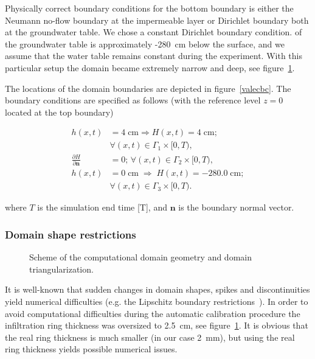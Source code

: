 \documentclass[review,times,3p,10pt]{elsarticle}
\newenvironment{lineq}
    {\begin{linenomath*}
    \begin{equation}
    }
    { 
    \end{equation} 
    \end{linenomath*}
    }
\renewcommand{\vec}{\mathbf}
\newcommand{\mich}[1]{{\color{magenta}{#1}}}
\begin{document}
Physically correct boundary conditions for the bottom boundary is either the Neumann no-flow boundary at the impermeable layer or Dirichlet boundary both at the groundwater table. We chose a constant Dirichlet boundary condition. \mich{The minimal depth} of the groundwater table is approximately -280~cm below the surface, and  we assume that the water table remains constant during the experiment. With this particular setup the domain became extremely narrow and deep, see figure~\ref{valec}.





The locations of the domain boundaries are depicted in figure~\ref{valecbc}. The boundary conditions are specified as follows (with the reference level $z=0$ located at the top boundary)
\begin{lineq} 
\label{bccond}
\begin{split}
h(x,t) &= 4 \; \mbox{cm} \Rightarrow H(x,t) = 4 \; \mbox{cm}; \\ &\forall (x,t) \in \Gamma_1 \times [0,T), \\
\frac{\partial H}{\partial \vec{n}} &= 0; \, \forall (x,t) \in \Gamma_2 \times [0,T), \\
h(x,t) &= 0  \; \mbox{cm}  \; \Rightarrow \; H(x,t) = -280.0  \; \mbox{cm}; \\ &\forall (x,t) \in \Gamma_3 \times [0,T).
\end{split}
\end{lineq}
where $T$ is the simulation end time [T], and $\vec{n}$ is the boundary normal vector.

\subsubsection{Domain shape restrictions}
\label{shaperestr}

 \begin{figure}
\centering
{}
 \caption{Scheme of the computational domain geometry and domain triangularization.}
 \label{valec}
\end{figure}


It is well-known that sudden changes in domain shapes, spikes and discontinuities yield numerical difficulties (e.g. the Lipschitz boundary restrictions~\citep{braess}).
In order to avoid computational difficulties during the automatic calibration procedure the infiltration ring thickness was oversized  to 2.5~cm, see figure~\ref{valec}. It is obvious that the real ring thickness is much smaller (in our case 2~mm), but using the real ring thickness yields possible numerical issues. 
\end{document}
